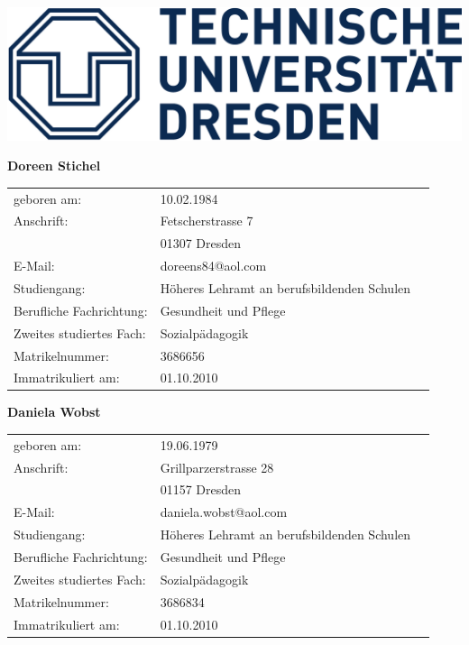 \begin{flushright}
	\includegraphics[scale=0.5]{images/TU-Logo.png}
\end{flushright}

\noindent
\textbf{Doreen Stichel}\\[0,5cm]
\begin{tabular}{lll}
geboren am: & 10.02.1984\\[0,5cm]
Anschrift: & Fetscherstrasse 7\\
& 01307 Dresden\\[0,5cm]
E-Mail: & \flq{}doreens84@aol.com\frq{}\\[0,5cm]
Studiengang: & Höheres Lehramt an berufsbildenden Schulen\\
Berufliche Fachrichtung: & Gesundheit und Pflege\\
Zweites studiertes Fach: & Sozialpädagogik\\[0,5cm]
Matrikelnummer: & 3686656\\[0,5cm]
Immatrikuliert am: & 01.10.2010\\[2cm]
\end{tabular}

\noindent
\textbf{Daniela Wobst}\\[0,5cm]
\begin{tabular}{lll}
geboren am: & 19.06.1979\\[0,5cm]
Anschrift: & Grillparzerstrasse 28\\
& 01157 Dresden\\[0,5cm]
E-Mail: & \flq{}daniela.wobst@aol.com\frq{}\\[0,5cm]
Studiengang: & Höheres Lehramt an berufsbildenden Schulen\\
Berufliche Fachrichtung: & Gesundheit und Pflege\\
Zweites studiertes Fach: & Sozialpädagogik\\[0,5cm]
Matrikelnummer: & 3686834\\[0,5cm]
Immatrikuliert am: & 01.10.2010
\end{tabular}